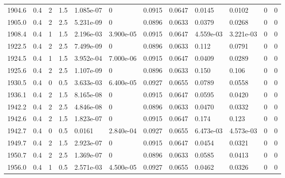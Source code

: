 \documentclass[preview]{standalone}
\begin{document}
{{{{{{{{{{{\begin{tabular}{L{1.2cm}C{1.2cm} C{0.3cm}C{0.5cm} C{1.4cm}C{1.4cm} C{1.4cm}C{1.4cm} C{1.6cm}C{1.6cm} C{1.6cm}C{1.6cm}}
  1904.6  &   0.4  & 2     & 1.5 &  1.085e-07  & 0  &  0.0915&   0.0647& 0.0145 & 0.0102   &  0 & 0  \\ 
  1905.0  &   0.4  & 2     & 2.5 &  5.231e-09  & 0  &  0.0896&   0.0633& 0.0379 & 0.0268   &  0 & 0  \\ 
  1908.4  &   0.4  & 1     & 1.5 &  2.196e-03  & 3.900e-05  &  0.0915&   0.0647& 4.559e-03 & 3.221e-03   &  0 & 0  \\ 
  1922.5  &   0.4  & 2     & 2.5 &  7.499e-09  & 0  &  0.0896&   0.0633& 0.112 & 0.0791   &  0 & 0  \\ 
  1924.5  &   0.4  & 1     & 1.5 &  3.952e-04  & 7.000e-06  &  0.0915&   0.0647& 0.0409 & 0.0289   &  0 & 0  \\ 
  1925.6  &   0.4  & 2     & 2.5 &  1.107e-09  & 0  &  0.0896&   0.0633& 0.150 & 0.106   &  0 & 0  \\ 
  1930.5  &   0.4  & 0     & 0.5 &  3.633e-03  & 6.400e-05  &  0.0927&   0.0655& 0.0789 & 0.0558   &  0 & 0  \\ 
  1936.1  &   0.4  & 2     & 1.5 &  8.165e-08  & 0  &  0.0915&   0.0647& 0.0595 & 0.0420   &  0 & 0  \\ 
  1942.2  &   0.4  & 2     & 2.5 &  4.846e-08  & 0  &  0.0896&   0.0633& 0.0470 & 0.0332   &  0 & 0  \\ 
  1942.6  &   0.4  & 2     & 1.5 &  1.823e-07  & 0  &  0.0915&   0.0647& 0.174 & 0.123   &  0 & 0  \\ 
  1942.7  &   0.4  & 0     & 0.5 &  0.0161  & 2.840e-04  &  0.0927&   0.0655& 6.473e-03 & 4.573e-03   &  0 & 0  \\ 
  1949.7  &   0.4  & 2     & 1.5 &  2.923e-07  & 0  &  0.0915&   0.0647& 0.0454 & 0.0321   &  0 & 0  \\ 
  1950.7  &   0.4  & 2     & 2.5 &  1.369e-07  & 0  &  0.0896&   0.0633& 0.0585 & 0.0413   &  0 & 0  \\ 
  1956.0  &   0.4  & 1     & 0.5 &  2.571e-03  & 4.500e-05  &  0.0927&   0.0655& 0.0462 & 0.0326   &  0 & 0  \\ 
\hline 
\end{tabular} 

}}}}}}}}}}}
\end{document}
